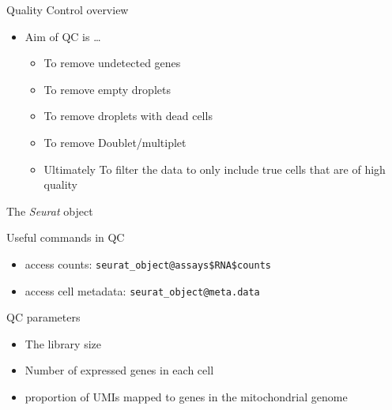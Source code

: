 \documentclass[
  ignorenonframetext,
]{beamer}
\providecommand{\tightlist}{%
  \setlength{\itemsep}{0pt}\setlength{\parskip}{0pt}}
\begin{document}
\begin{frame}[fragile]{Quality Control overview}
\label{quality-control-overview}
\begin{itemize}
\tightlist
\item
  Aim of QC is \ldots{}

  \begin{itemize}
  \tightlist
  \item
    To remove undetected genes
  \item
    To remove empty droplets
  \item
    To remove droplets with dead cells
  \item
    To remove Doublet/multiplet
  \item
    Ultimately To filter the data to only include true cells that are of
    high quality
  \end{itemize}
\end{itemize}

\begin{frame}{The \emph{Seurat} object}
\label{the-seurat-object}
\end{frame}

\begin{frame}[fragile]{Useful commands in QC}
\label{useful-commands-in-qc}
\begin{itemize}
\item
  access counts: \texttt{seurat\_object@assays\$RNA\$counts}
\item
  access cell metadata: \texttt{seurat\_object@meta.data}
\end{itemize}
\end{frame}

\begin{frame}{QC parameters}
\label{qc-parameters}
\begin{itemize}
\tightlist
\item
  The library size
\item
  Number of expressed genes in each cell
\item
  proportion of UMIs mapped to genes in the mitochondrial genome
\end{itemize}
\end{frame}
\end{frame}
\end{document}
